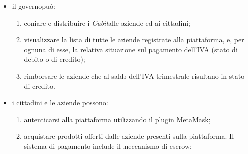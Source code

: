\begin{itemize}
	\item il governo\glosp può:
	\begin{enumerate}[label=\alph*.]
		\item coniare e distribuire i \textit{Cubit}\glosp alle aziende ed ai cittadini;
		\item visualizzare la lista di tutte le aziende registrate alla piattaforma, e, per ognuna di esse, la relativa situazione sul pagamento dell'IVA (stato di debito o di credito); 
		\item rimborsare le aziende che al saldo dell'IVA trimestrale risultano in stato di credito.
	\end{enumerate}
	\item i cittadini e le aziende possono:
	\begin{enumerate}[label=\alph*.]
		\item autenticarsi alla piattaforma utilizzando il plugin MetaMask\glo;
		\item acquistare prodotti offerti dalle aziende presenti sulla piattaforma. Il sistema di pagamento include il meccanismo di escrow\glo:
		

\end{enumerate}
\end{itemize}
